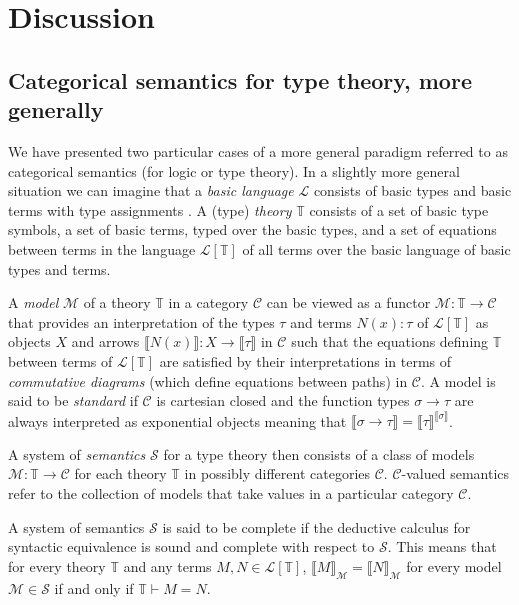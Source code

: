 \documentclass[10pt]{article}
\theoremstyle{plain}
\theoremstyle{definition}
\theoremstyle{remark}
\begin{document}
\section{Discussion}
\subsection{Categorical semantics for type theory, more generally}
We have presented two particular cases of a more general paradigm referred to as categorical semantics (for logic or type theory). In a slightly more general situation we can imagine that a \emph{basic language} $\mathcal{L}$ consists of basic types and basic terms with type assignments \cite{Awodey2000}. A (type) \emph{theory} $\mathbb{T}$ consists of a set of basic type symbols, a set of basic terms, typed over the basic types, and a set of equations between terms in the language $\mathcal{L}[\mathbb{T}]$ of all terms over the basic language of basic types and terms.

A \emph{model} $\mathcal{M}$ of a theory $\mathbb{T}$ in a category $\mathcal{C}$ can be viewed as a functor $\mathcal{M} \colon \mathbb{T} \rightarrow \mathcal{C}$ that provides an interpretation of the types $\tau$ and terms $N(x) \colon \tau$ of $\mathcal{L}[\mathbb{T}]$ as objects $X$ and arrows $\llbracket N(x) \rrbracket \colon X \rightarrow \llbracket \tau \rrbracket$ in $\mathcal{C}$ such that the equations defining $\mathbb{T}$ between terms of $\mathcal{L}[\mathbb{T}]$ are satisfied by their interpretations in terms of \emph{commutative diagrams} (which define equations between paths) in $\mathcal{C}$. A model is said to be \emph{standard} if $\mathcal{C}$ is cartesian closed and the function types $\sigma \rightarrow \tau$ are always interpreted as exponential objects meaning that $\llbracket \sigma \rightarrow \tau \rrbracket = \llbracket \tau \rrbracket ^ {\llbracket \sigma \rrbracket}$.

A system of \emph{semantics} $\mathcal{S}$ for a type theory then consists of a class of models $\mathcal{M} \colon \mathbb{T} \rightarrow \mathcal{C}$ for each theory $\mathbb{T}$ in possibly different categories $\mathcal{C}$. $\mathcal{C}$-valued semantics refer to the collection of models that take values in a particular category $\mathcal{C}$.

A system of semantics $\mathcal{S}$ is said to be complete if the deductive calculus for syntactic equivalence is sound and complete with respect to $\mathcal{S}$. This means that for every theory $\mathbb{T}$ and any terms $M, N \in \mathcal{L}[\mathbb{T}]$, $\llbracket M \rrbracket_{\mathcal{M}} = \llbracket N \rrbracket_{\mathcal{M}}$ for every model $\mathcal{M} \in \mathcal{S}$ if and only if $\mathbb{T} \vdash M = N$.
\end{document}

